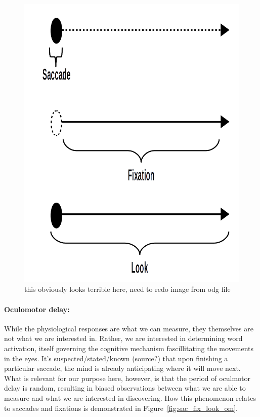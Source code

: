 \documentclass{article}
\begin{document}
\begin{figure}
\centering
\includegraphics[scale=0.25]{sac_fix_look.png}
\caption{this  obviously looks terrible here, need to redo image from odg file}
\label{fig:sac_fix_look}
\end{figure}

\paragraph{Oculomotor delay:} While the physiological responses are what we can measure, they themselves are not what we are interested in. Rather, we are interested in determining word activation, itself governing the cognitive mechanism fascillitating the movements in the eyes. It's suspected/stated/known (source?) that upon finishing a particular saccade, the mind is already anticipating where it will move next. What is relevant for our purpose here, however, is that the period of oculmotor delay is random, resulting in biased observations between what we are able to measure and what we are interested in discovering. How this phenomenon relates to saccades and fixations is demonstrated in Figure~\ref{fig:sac_fix_look_om}.
\end{document}
